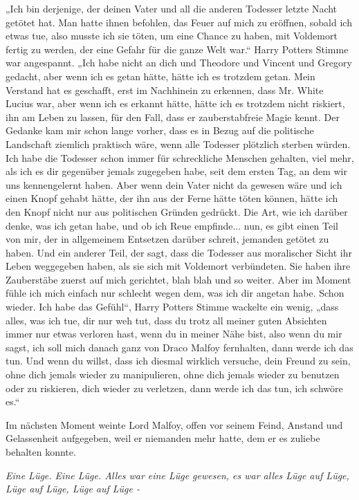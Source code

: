 {„Ich bin derjenige, der deinen Vater und all die anderen Todesser letzte Nacht getötet hat. Man hatte ihnen befohlen, das Feuer auf mich zu eröffnen, sobald ich etwas tue, also musste ich sie töten, um eine Chance zu haben, mit Voldemort fertig zu werden, der eine Gefahr für die ganze Welt war.“ Harry Potters Stimme war angespannt. „Ich habe nicht an dich und Theodore und Vincent und Gregory gedacht, aber wenn ich es getan hätte, hätte ich es trotzdem getan. Mein Verstand hat es geschafft, erst im Nachhinein zu erkennen, dass Mr. White Lucius war, aber wenn ich es erkannt hätte, hätte ich es trotzdem nicht riskiert, ihn am Leben zu lassen, für den Fall, dass er zauberstabfreie Magie kennt. Der Gedanke kam mir schon lange vorher, dass es in Bezug auf die politische Landschaft ziemlich praktisch wäre, wenn alle Todesser plötzlich sterben würden. Ich habe die Todesser schon immer für schreckliche Menschen gehalten, viel mehr, als ich es dir gegenüber jemals zugegeben habe, seit dem ersten Tag, an dem wir uns kennengelernt haben. Aber wenn dein Vater nicht da gewesen wäre und ich einen Knopf gehabt hätte, der ihn aus der Ferne hätte töten können, hätte ich den Knopf nicht nur aus politischen Gründen gedrückt. Die Art, wie ich darüber denke, was ich getan habe, und ob ich Reue empfinde... nun, es gibt einen Teil von mir, der in allgemeinem Entsetzen darüber schreit, jemanden getötet zu haben. Und ein anderer Teil, der sagt, dass die Todesser aus moralischer Sicht ihr Leben weggegeben haben, als sie sich mit Voldemort verbündeten. Sie haben ihre Zauberstäbe zuerst auf mich gerichtet, blah blah und so weiter. Aber im Moment fühle ich mich einfach nur schlecht wegen dem, was ich dir angetan habe. Schon wieder. Ich habe das Gefühl“, Harry Potters Stimme wackelte ein wenig, „dass alles, was ich tue, dir nur weh tut, dass du trotz all meiner guten Absichten immer nur etwas verloren hast, wenn du in meiner Nähe bist, also wenn du mir sagst, ich soll mich danach ganz von Draco Malfoy fernhalten, dann werde ich das tun. Und wenn du willst, dass ich diesmal wirklich versuche, dein Freund zu sein, ohne dich jemals wieder zu manipulieren, ohne dich jemals wieder zu benutzen oder zu riskieren, dich wieder zu verletzen, dann werde ich das tun, ich schwöre es.“

Im nächsten Moment weinte Lord Malfoy, offen vor seinem Feind, Anstand und Gelassenheit aufgegeben, weil er niemanden mehr hatte, dem er es zuliebe behalten konnte.

\emph{Eine Lüge. Eine Lüge. Alles war eine Lüge gewesen, es war alles Lüge auf Lüge, Lüge auf Lüge, Lüge auf Lüge -}

}
